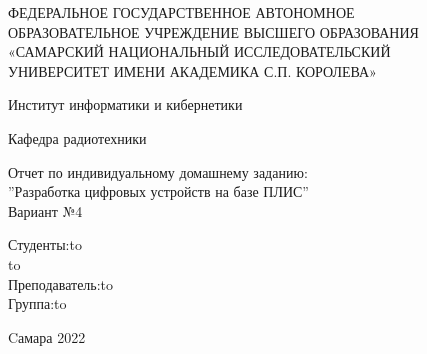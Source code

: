 \begin{titlepage}
\newpage
\doublespacing
\begin{center}
ФЕДЕРАЛЬНОЕ ГОСУДАРСТВЕННОЕ АВТОНОМНОЕ\\
ОБРАЗОВАТЕЛЬНОЕ УЧРЕЖДЕНИЕ ВЫСШЕГО ОБРАЗОВАНИЯ\\
«САМАРСКИЙ НАЦИОНАЛЬНЫЙ ИССЛЕДОВАТЕЛЬСКИЙ\\
УНИВЕРСИТЕТ ИМЕНИ АКАДЕМИКА С.П. КОРОЛЕВА»	
 \\
\end{center}

\vspace{5em}

\begin{center}
 Институт информатики и кибернетики \\ 
\end{center}

\begin{center}
Кафедра радиотехники \\ 
\end{center}


\vspace{3em}

\begin{center}
{Отчет по индивидуальному домашнему заданию:\\''Разработка цифровых устройств на базе ПЛИС''\\Вариант №4}
\end{center}

\vspace{12em}



\newbox{\lbox}
\newlength{\maxl}
\setlength{\maxl}{\wd\lbox}
\hfill\parbox{7cm}{
\hspace*{4cm}\hspace*{-4cm}Студенты:\hfill\hbox to\\
\hspace*{4cm}\hspace*{-4cm}\hfill\hbox to\\
\hspace*{4cm}\hspace*{-4cm}Преподаватель:\hfill\hbox to\\
\hspace*{4cm}\hspace*{-4cm}Группа:\hfill\hbox to\\
}

\vspace{\fill}

\begin{center}
Cамара 2022
\end{center}

\end{titlepage}